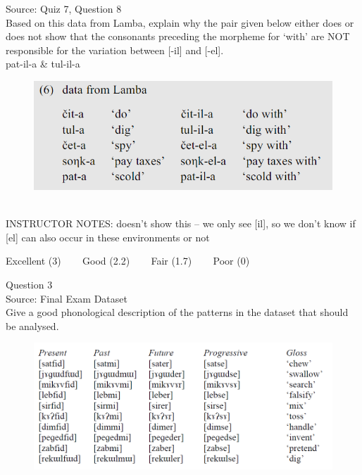 \documentclass[12pt]{article}
\begin{document}
Source: Quiz 7, Question 8\\

Based on this data from Lamba, explain why the pair given below either does or does not show that the consonants preceding the morpheme for `with' are NOT responsible for the variation between [-il] and [-el].\\

pat-il-a \& tul-il-a

\begin{figure}[H]
\includegraphics{../images/peng119_lamba.png}
\end{figure}

~\\
INSTRUCTOR NOTES: doesn't show this -- we only see [il], so we don't know if [el] can also occur in these environments or not


\vfill
Excellent (3) ~~~ Good (2.2) ~~~ Fair (1.7) ~~~ Poor (0)
\newpage

{\large Question 3}\\

Source: Final Exam Dataset\\

Give a good phonological description of the patterns in the dataset that should be analysed.\\

\begin{figure}[H]
\includegraphics{../images/final_dataset.png}
\end{figure}
\end{document}
